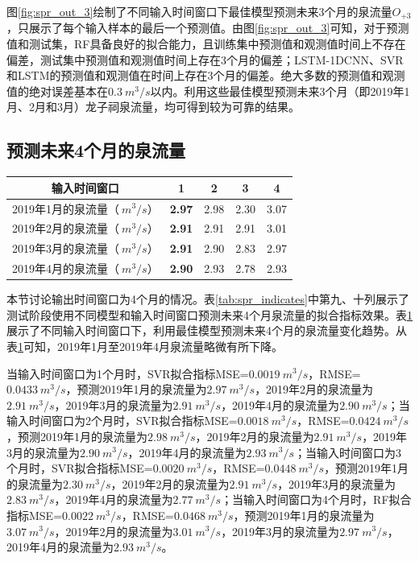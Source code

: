 图\ref{fig:spr_out_3}绘制了不同输入时间窗口下最佳模型预测未来3个月的泉流量$O_{+3}$，只展示了每个输入样本的最后一个预测值。由图\ref{fig:spr_out_3}可知，对于预测值和测试集，RF具备良好的拟合能力，且训练集中预测值和观测值时间上不存在偏差，测试集中预测值和观测值时间上存在3个月的偏差；LSTM-1DCNN、SVR和LSTM的预测值和观测值在时间上存在3个月的偏差。绝大多数的预测值和观测值的绝对误差基本在$\SI{0.3}{m^{3}/s}$以内。利用这些最佳模型预测未来3个月（即2019年1月、2月和3月）龙子祠泉流量，均可得到较为可靠的结果。

\subsection{预测未来4个月的泉流量}\label{sec:spr_four}

\begin{table}[!htbp]
  \centering
  \label{tab:spr_four}
  \footnotesize
  \begin{tabular}{ccccc}
    \toprule
    输入时间窗口 & 1 & 2 & 3 & 4\\
    \midrule
    2019年1月的泉流量（$\SI{}{m^{3}/s}$）& \textbf{2.97} & 2.98 & 2.30 & 3.07 \\
    2019年2月的泉流量（$\SI{}{m^{3}/s}$）& \textbf{2.91} & 2.91 & 2.91 & 3.01 \\
    2019年3月的泉流量（$\SI{}{m^{3}/s}$）& \textbf{2.91} & 2.90 & 2.83 & 2.97 \\
    2019年4月的泉流量（$\SI{}{m^{3}/s}$）& \textbf{2.90} & 2.93 & 2.78 & 2.93 \\
    \bottomrule
  \end{tabular}
\end{table}

本节讨论输出时间窗口为4个月的情况。表\ref{tab:spr_indicates}中第九、十列展示了测试阶段使用不同模型和输入时间窗口预测未来4个月泉流量的拟合指标效果。表\ref{tab:spr_four}展示了不同输入时间窗口下，利用最佳模型预测未来4个月的泉流量变化趋势。从表\ref{tab:spr_four}可知，2019年1月至2019年4月泉流量略微有所下降。

当输入时间窗口为1个月时，SVR拟合指标MSE=$\SI{0.0019}{m^{3}/s}$，RMSE=\\$\SI{0.0433}{m^{3}/s}$，预测2019年1月的泉流量为$\SI{2.97}{m^{3}/s}$，2019年2月的泉流量为$\SI{2.91}{m^{3}/s}$，2019年3月的泉流量为$\SI{2.91}{m^{3}/s}$，2019年4月的泉流量为$\SI{2.90}{m^{3}/s}$；当输入时间窗口为2个月时，SVR拟合指标MSE=$\SI{0.0018}{m^{3}/s}$，RMSE=$\SI{0.0424}{m^{3}/s}$，预测2019年1月的泉流量为$\SI{2.98}{m^{3}/s}$，2019年2月的泉流量为$\SI{2.91}{m^{3}/s}$，2019年3月的泉流量为$\SI{2.90}{m^{3}/s}$，2019年4月的泉流量为$\SI{2.93}{m^{3}/s}$；当输入时间窗口为3个月时，SVR拟合指标MSE=$\SI{0.0020}{m^{3}/s}$，RMSE=$\SI{0.0448}{m^{3}/s}$，预测2019年1月的泉流量为$\SI{2.30}{m^{3}/s}$，2019年2月的泉流量为$\SI{2.91}{m^{3}/s}$，2019年3月的泉流量为$\SI{2.83}{m^{3}/s}$，2019年4月的泉流量为$\SI{2.77}{m^{3}/s}$；当输入时间窗口为4个月时，RF拟合指标MSE=$\SI{0.0022}{m^{3}/s}$，RMSE=$\SI{0.0468}{m^{3}/s}$，预测2019年1月的泉流量为$\SI{3.07}{m^{3}/s}$，2019年2月的泉流量为$\SI{3.01}{m^{3}/s}$，2019年3月的泉流量为$\SI{2.97}{m^{3}/s}$，2019年4月的泉流量为$\SI{2.93}{m^{3}/s}$。

